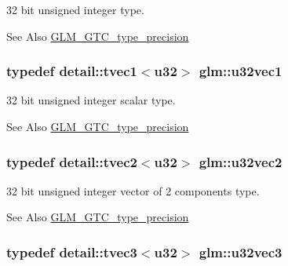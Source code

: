 32 bit unsigned integer type. 

\begin{DoxySeeAlso}{See Also}
\hyperlink{group__gtc__type__precision}{G\-L\-M\-\_\-\-G\-T\-C\-\_\-type\-\_\-precision} 
\end{DoxySeeAlso}
\hypertarget{group__gtc__type__precision_ga690033f989275bb90f793a785dc45521}{
\subsubsection[{u32vec1}]{\setlength{\rightskip}{0pt plus 5cm}typedef detail\-::tvec1$<$u32$>$ {\bf glm\-::u32vec1}}}\label{group__gtc__type__precision_ga690033f989275bb90f793a785dc45521}


32 bit unsigned integer scalar type. 

\begin{DoxySeeAlso}{See Also}
\hyperlink{group__gtc__type__precision}{G\-L\-M\-\_\-\-G\-T\-C\-\_\-type\-\_\-precision} 
\end{DoxySeeAlso}
\hypertarget{group__gtc__type__precision_ga6cad9c800c714098d4adc0ee7746b48c}{
\subsubsection[{u32vec2}]{\setlength{\rightskip}{0pt plus 5cm}typedef detail\-::tvec2$<$u32$>$ {\bf glm\-::u32vec2}}}\label{group__gtc__type__precision_ga6cad9c800c714098d4adc0ee7746b48c}


32 bit unsigned integer vector of 2 components type. 

\begin{DoxySeeAlso}{See Also}
\hyperlink{group__gtc__type__precision}{G\-L\-M\-\_\-\-G\-T\-C\-\_\-type\-\_\-precision} 
\end{DoxySeeAlso}
\hypertarget{group__gtc__type__precision_gac56c189cd9527b002389e43076f30805}{
\subsubsection[{u32vec3}]{\setlength{\rightskip}{0pt plus 5cm}typedef detail\-::tvec3$<$u32$>$ {\bf glm\-::u32vec3}}}\label{group__gtc__type__precision_gac56c189cd9527b002389e43076f30805}


